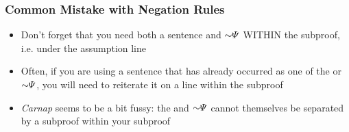 \begin{frame}
\frametitle{Common Mistake with Negation Rules}

\begin{itemize}[<+->]

\item Don't forget that you need both a sentence \metaB{} and $\enot \metaB{}$ WITHIN the subproof, i.e. under the assumption line

\item Often, if you are using a sentence that has already occurred as one of the \metaB{} or $\enot \metaB{}$, you will need to reiterate it on a line within the subproof

\item  \textit{Carnap} seems to be a bit fussy: the  \metaB{} and $\enot \metaB{}$ cannot themselves be separated by a subproof within your subproof 



\end{itemize}
\end{frame}